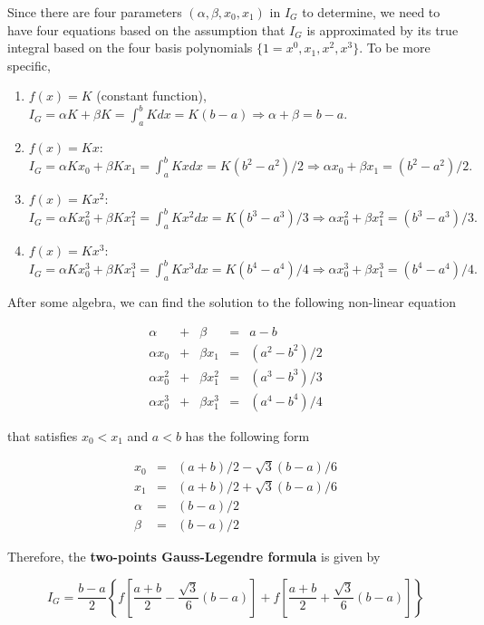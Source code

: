 \documentclass[
]{book}
\begin{document}
Since there are four parameters \((\alpha, \beta, x_0, x_1)\) in \(I_G\) to determine, we need to have four equations based on the assumption that \(I_G\) is approximated by its true integral based on the four basis polynomials \(\{1 = x^0, x_1, x^2, x^3 \}\). To be more specific,

\begin{enumerate}
\def\labelenumi{\arabic{enumi}.}
\item
  \(f(x) = K\) (constant function), \(I_G = \alpha K + \beta K = \int_a^b Kdx = K(b-a) \Rightarrow \alpha + \beta = b - a.\)
\item
  \(f(x) =Kx\): \(I_G = \alpha K x_0 + \beta K x_1= \int_a^b Kxdx = K(b^2-a^2)/2 \Rightarrow \alpha x_0+ \beta x_1= (b^2 - a^2)/2.\)
\item
  \(f(x) =Kx^2\): \(I_G = \alpha K x^2_0 + \beta K x^2_1= \int_a^b Kx^2dx = K(b^3-a^3)/3 \Rightarrow \alpha x^2_0+ \beta x^2_1= (b^3 - a^3)/3.\)
\item
  \(f(x) =Kx^3\): \(I_G = \alpha K x^3_0 + \beta K x^3_1= \int_a^b Kx^3dx = K(b^4-a^4)/4 \Rightarrow \alpha x^3_0+ \beta x^3_1= (b^4 - a^4)/4.\)
\end{enumerate}

After some algebra, we can find the solution to the following non-linear equation

\[
\begin{array}{lllll}
\alpha & + & \beta & = & a - b  \\ 
\alpha x_0 & + & \beta x_1 & = & (a^2-b^2)/2   \\ 
\alpha x^2_0 & + & \beta x^2_1 & = & (a^3-b^3)/3   \\ 
\alpha x^3_0 & + & \beta x^3_1 & = & (a^4-b^4)/4
\end{array}
\]

that satisfies \(x_0 < x_1\) and \(a < b\) has the following form

\[
\begin{array}{lllll}
x_0     & = & (a+b)/2 - \sqrt{3}(b-a)/6  \\ 
x_1     & = & (a+b)/2 + \sqrt{3}(b-a)/6   \\ 
\alpha  & = & (b-a)/2   \\ 
\beta   & = & (b-a)/2 
\end{array}
\]

Therefore, the \textbf{two-points Gauss-Legendre formula} is given by

\[
I_G = \frac{b-a}{2}\left\{ f\left[\frac{a+b}{2}-\frac{\sqrt{3}}{6}(b-a) \right] + f\left[\frac{a+b}{2}+\frac{\sqrt{3}}{6}(b-a) \right]\right\}
\]
\end{document}
